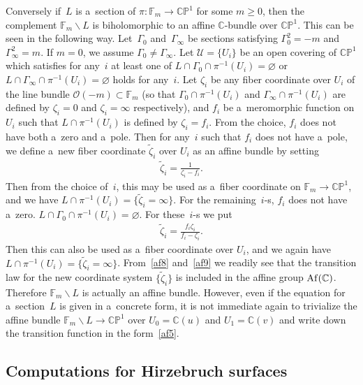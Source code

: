 \documentclass[pdftex]{sigma}
\numberwithin{equation}{section}
\begin{document}
Conversely if~$L$ is a~section of $\pi:\mathbb{F}_m\to\mathbb{CP}^1$ for some $m\ge 0$, then the complement
$\mathbb{F}_m\backslash L$ is biholomorphic to an af\/f\/ine $\mathbb{C}$-bundle over $\mathbb{CP}^1$.
This can be seen in the following way.
Let~$\Gamma_0$ and~$\Gamma_{\infty}$ be sections satisfying $\Gamma_0^2 = -m$ and $\Gamma_{\infty}^2 = m$.
If $m=0$, we assume $\Gamma_0\neq \Gamma_{\infty}$.
Let $\mathscr U=\{U_i\}$ be an open covering of $\mathbb{CP}^1$ which satisf\/ies for any~$i$ at least one of $L\cap
\Gamma_0\cap \pi^{-1} (U_i)=\varnothing$ or $L\cap \Gamma_{\infty}\cap \pi^{-1} (U_i)=\varnothing$ holds for any~$i$.
Let $\zeta_i$ be any f\/iber coordinate over $U_i$ of the line bundle $\mathscr O(-m)\subset\mathbb{F}_m$ (so that
$\Gamma_0\cap\pi^{-1} (U_i)$ and $\Gamma_{\infty}\cap\pi^{-1} (U_i)$ are def\/ined by $\zeta_i=0$ and $\zeta_i=\infty$
respectively), and $f_i$ be a~meromorphic function on $U_i$ such that $L\cap\pi^{-1} (U_i)$ is def\/ined by $\zeta_i =
f_i$.
From the choice, $f_i$ does not have both a~zero and a~pole.
Then for any~$i$ such that $f_i$ does not have a~pole, we def\/ine a~new f\/iber coordinate $\tilde{\zeta}_i$ over $U_i$
as an af\/f\/ine bundle by setting
\begin{gather}
\label{af8}
\tilde{\zeta}_i = \frac 1{\zeta_i-f_i}.
\end{gather}
Then from the choice of~$i$, this may be used as a~f\/iber coordinate on $\mathbb{F}_m\to\mathbb{CP}^1$, and we have
$L\cap \pi^{-1}(U_i) = \{\tilde{\zeta}_i = \infty\}$.
For the remaining~$i$-s, $f_i$ does not have a~zero.
$L\cap \Gamma_0 \cap \pi^{-1} (U_i)=\varnothing$.
For these~$i$-s we put
\begin{gather}
\label{af9}
\tilde{\zeta}_i = \frac{f_i\zeta_i}{f_i-\zeta_i}.
\end{gather}
Then this can also be used as a~f\/iber coordinate over $U_i$, and we again have $L\cap \pi^{-1}(U_i) =
\{\tilde{\zeta}_i = \infty\}$.
From~\eqref{af8} and~\eqref{af9} we readily see that the transition law for the new coordinate system
$\{\tilde{\zeta}_i\}$ is included in the af\/f\/ine group ${\rm Af}(\mathbb{C})$.
Therefore $\mathbb{F}_m\backslash L$ is actually an af\/f\/ine bundle.
However, even if the equation for a~section~$L$ is given in a~concrete form, it is not immediate again to trivialize the
af\/f\/ine bundle $\mathbb{F}_m\backslash L\to\mathbb{CP}^1$ over $U_0=\mathbb{C}(u)$ and $U_1=\mathbb{C}(v)$ and write
down the transition function in the form~\eqref{af5}.

\subsection{Computations for Hirzebruch surfaces}
\end{document}
